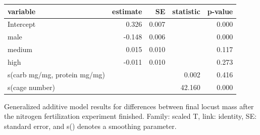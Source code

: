 \documentclass[
]{article}
\begin{document}
\begin{tbl}

\begin{minipage}{\linewidth}

\begingroup
\fontsize{12.0pt}{14.4pt}\selectfont
\begin{longtable*}{lrrrr}
\toprule
variable & estimate & SE & statistic & p-value \\ 
\midrule\addlinespace[2.5pt]
Intercept & 0.326 & 0.007 &  & 0.000 \\ 
male & -0.148 & 0.006 &  & 0.000 \\ 
medium & 0.015 & 0.010 &  & 0.117 \\ 
high & -0.011 & 0.010 &  & 0.273 \\ 
s(carb mg/mg, protein mg/mg) &  &  & 0.002 & 0.416 \\ 
s(cage number) &  &  & 42.160 & 0.000 \\ 
\bottomrule
\end{longtable*}
\endgroup

\end{minipage}%

\caption{\label{tbl-field-cage-locust-mass}Generalized additive model
results for differences between final locust mass after the nitrogen
fertilization experiment finished. Family: scaled T, link: identity, SE:
standard error, and s() denotes a smoothing parameter.}

\end{tbl}%
\end{document}
